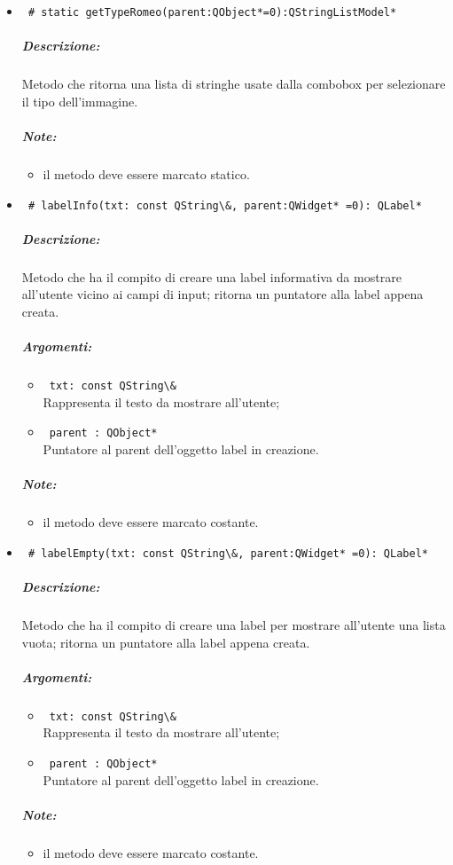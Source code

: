 \begin{itemize}
\item \color{blue}\verb! # static getTypeRomeo(parent:QObject*=0):QStringListModel*!
\color{black} 
\subparagraph{Descrizione:}
Metodo che ritorna una lista di stringhe usate dalla combobox per selezionare il tipo dell'immagine.
\subparagraph{Note:}
\begin{itemize}
\item il metodo deve essere marcato statico.
\end{itemize}
\color{black}

\item \color{blue} \verb! # labelInfo(txt: const QString\&, parent:QWidget* =0): QLabel*! \\
\color{black}
\subparagraph{Descrizione:} Metodo che ha il compito di creare una label informativa da mostrare all'utente vicino ai campi di input; ritorna un puntatore alla label appena creata.
\subparagraph{Argomenti:}
\begin{itemize}
\item \color{RoyalPurple} \verb! txt: const QString\& ! \\Rappresenta il testo da mostrare all'utente;
\item \color{RoyalPurple} \verb! parent : QObject* ! \\ Puntatore al parent dell'oggetto label in creazione.
\end{itemize}
\subparagraph{Note:}
\begin{itemize}
\item il metodo deve essere marcato costante.
\end{itemize}

\item \color{blue} \verb! # labelEmpty(txt: const QString\&, parent:QWidget* =0): QLabel*! \\
\color{black}
\subparagraph{Descrizione:} Metodo che ha il compito di creare una label per mostrare all'utente una lista vuota; ritorna un puntatore alla label appena creata.
\subparagraph{Argomenti:}
\begin{itemize}
\item \color{RoyalPurple} \verb! txt: const QString\& ! \\Rappresenta il testo da mostrare all'utente;
\item \color{RoyalPurple} \verb! parent : QObject* ! \\ Puntatore al parent dell'oggetto label in creazione.
\end{itemize}
\subparagraph{Note:}
\begin{itemize}
\item il metodo deve essere marcato costante.
\end{itemize}


\end{itemize}
